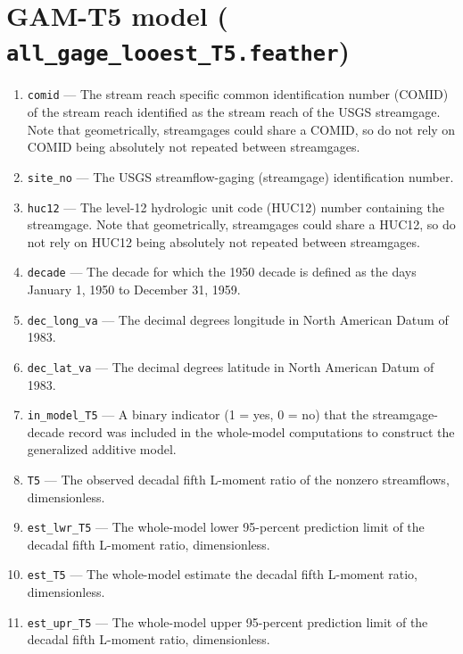 \documentclass[1p, authoryear, 11pt, times, preprint]{elsarticle}
\newcommand{\code}[1]{{\color{black}%
                       \mbox{\lstinline[basicstyle={\small\ttfamily},
                                        keywordstyle=\scriptsize\ttfamily]|#1|}}}
\begin{document}


\section{GAM-T5 model (\code{all_gage_looest_T5.feather})}
\begin{enumerate}
\footnotesize
\RaggedRight
\item \code{comid} --- The stream reach specific common identification number (COMID) of the stream reach identified as the stream reach of the USGS streamgage. Note that geometrically, streamgages could share a COMID, so do not rely on COMID being absolutely not repeated between streamgages.
\item \code{site_no} --- The USGS streamflow-gaging (streamgage) identification number.
\item \code{huc12} --- The level-12 hydrologic unit code (HUC12) number containing the streamgage. Note that geometrically, streamgages could share a HUC12, so do not rely on HUC12 being absolutely not repeated between streamgages.
\item \code{decade} --- The decade for which the 1950 decade is defined as the days January 1, 1950 to December 31, 1959.
\item \code{dec_long_va} --- The decimal degrees longitude in North American Datum of 1983.
\item \code{dec_lat_va} --- The decimal degrees latitude in North American Datum of 1983.
\item \code{in_model_T5} --- A binary indicator (1 = yes, 0 = no) that the streamgage-decade record was included in the whole-model computations to construct the generalized additive model.
\item \code{T5} --- The observed decadal fifth L-moment ratio of the nonzero streamflows, dimensionless.
\item \code{est_lwr_T5} --- The whole-model lower 95-percent prediction limit of the decadal fifth L-moment ratio, dimensionless.
\item \code{est_T5} --- The whole-model estimate the decadal fifth L-moment ratio, dimensionless.
\item \code{est_upr_T5} --- The whole-model upper 95-percent prediction limit of the decadal fifth L-moment ratio, dimensionless.

\end{enumerate}
\end{document}
